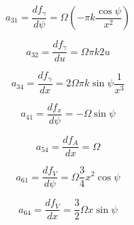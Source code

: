 \documentclass[12pt]{article}
\begin{document}
$$
a_{31} = \frac{df_{\gamma}}{d\psi} = \Omega (- \pi k \frac{\cos \psi}{x^2})
$$

$$
a_{32} = \frac{df_{\gamma}}{du} = \Omega \pi k 2 u
$$

$$
a_{34} = \frac{df_{\gamma}}{dx} = 2 \Omega \pi k \sin\psi \frac{1}{x^3}
$$

$$
a_{41} = \frac{df_{x}}{d\psi} = - \Omega \sin \psi
$$

$$
a_{54} = \frac{df_{A}}{dx} = \Omega
$$

$$
a_{61} = \frac{df_{V}}{d\psi} = \Omega \frac{3}{4} x^2 \cos \psi
$$

$$
a_{64} = \frac{df_{V}}{dx} = \frac{3}{2}\Omega x \sin \psi 
$$




\printbibliography
\end{document}
